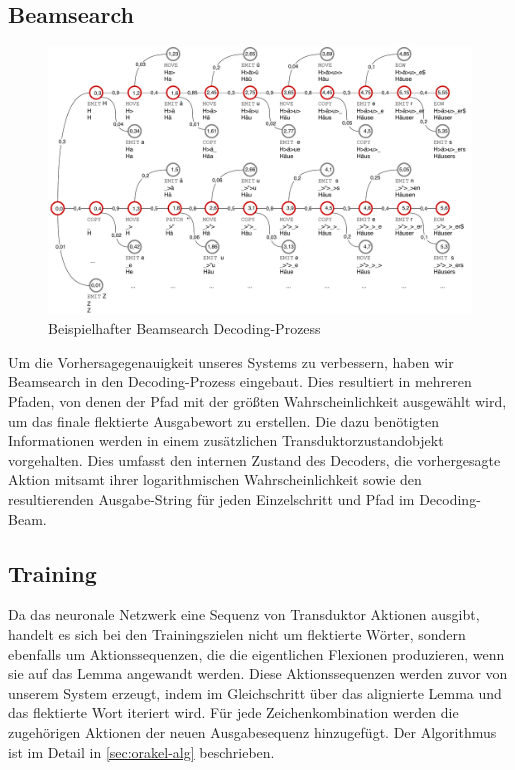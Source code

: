 \documentclass[a4paper]{article}
\begin{document}
\subsection{Beamsearch}

\begin{figure}
\centering
\includegraphics[width=\linewidth, height=\textheight,keepaspectratio]{beam_search}
\caption{Beispielhafter Beamsearch Decoding-Prozess}
\label{fig:beam}
\end{figure}

Um die Vorhersagegenauigkeit unseres Systems zu verbessern, haben wir Beamsearch in den Decoding-Prozess eingebaut.
Dies resultiert in mehreren Pfaden, von denen der Pfad mit der größten Wahrscheinlichkeit ausgewählt wird, um das finale flektierte Ausgabewort zu erstellen.
Die dazu benötigten Informationen werden in einem zusätzlichen Transduktorzustandobjekt vorgehalten.
Dies umfasst den internen Zustand des Decoders, die vorhergesagte Aktion mitsamt ihrer logarithmischen Wahrscheinlichkeit sowie den resultierenden Ausgabe-String für jeden Einzelschritt und Pfad im Decoding-Beam.




\subsection{Training}

Da das neuronale Netzwerk eine Sequenz von Transduktor Aktionen ausgibt, handelt es sich bei den Trainingszielen nicht um flektierte Wörter, sondern ebenfalls um Aktionssequenzen, die die eigentlichen Flexionen produzieren, wenn sie auf das Lemma angewandt werden.
Diese Aktionssequenzen werden zuvor von unserem System erzeugt, indem im Gleichschritt über das alignierte Lemma und das flektierte Wort iteriert wird.
Für jede Zeichenkombination werden die zugehörigen Aktionen der neuen Ausgabesequenz hinzugefügt.
Der Algorithmus ist im Detail in \autoref{sec:orakel-alg} beschrieben.
\end{document}
